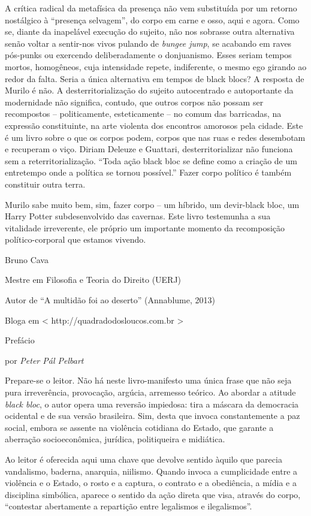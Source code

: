 A crítica radical da metafísica da presença não vem substituída por um
retorno nostálgico à ``presença selvagem'', do corpo em carne e osso,
aqui e agora. Como se, diante da inapelável execução do sujeito, não nos
sobrasse outra alternativa senão voltar a sentir-nos vivos pulando de
\emph{bungee jump}, se acabando em raves pós-punks ou exercendo
deliberadamente o donjuanismo. Esses seriam tempos mortos, homogêneos,
cuja intensidade repete, indiferente, o mesmo ego girando ao redor da
falta. Seria a única alternativa em tempos de black blocs? A resposta de
Murilo é não. A desterritorialização do sujeito autocentrado e
autoportante da modernidade não significa, contudo, que outros corpos
não possam ser recompostos -- politicamente, esteticamente -- no comum
das barricadas, na expressão constituinte, na arte violenta dos
encontros amorosos pela cidade. Este é um livro sobre o que os corpos
podem, corpos que nas ruas e redes desembotam e recuperam o viço. Diriam
Deleuze e Guattari, desterritorializar não funciona sem a
reterritorialização. ``Toda ação black bloc se define como a criação de
um entretempo onde a política se tornou possível.'' Fazer corpo político
é também constituir outra terra.

Murilo sabe muito bem, sim, fazer corpo -- um híbrido, um devir-black
bloc, um Harry Potter subdesenvolvido das cavernas. Este livro
testemunha a sua vitalidade irreverente, ele próprio um importante
momento da recomposição político-corporal que estamos vivendo.

Bruno Cava

Mestre em Filosofia e Teoria do Direito (UERJ)

Autor de ``A multidão foi ao deserto'' (Annablume, 2013)

Bloga em \textless{} http://quadradodosloucos.com.br \textgreater{}

Prefácio

por\emph{ Peter Pál Pelbart}

Prepare-se o leitor. Não há neste livro-manifesto uma única frase que
não seja pura irreverência, provocação, argúcia, arremesso teórico. Ao
abordar a atitude \emph{black bloc}, o autor opera uma reversão
impiedosa: tira a máscara da democracia ocidental e de sua versão
brasileira. Sim, desta que invoca constantemente a paz social, embora se
assente na violência cotidiana do Estado, que garante a aberração
socioeconômica, jurídica, politiqueira e midiática.

Ao leitor é oferecida aqui uma chave que devolve sentido àquilo que
parecia vandalismo, baderna, anarquia, niilismo\emph{.} Quando invoca a
cumplicidade entre a violência e o Estado, o rosto e a captura, o
contrato e a obediência, a mídia e a disciplina simbólica, aparece o
sentido da ação direta que visa, através do corpo, ``contestar
abertamente a repartição entre legalismos e ilegalismos''.

